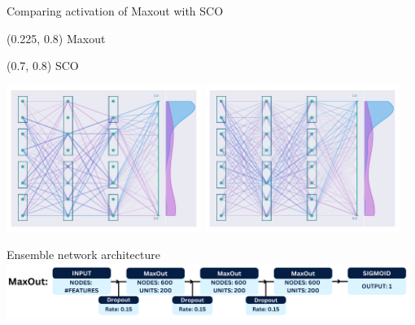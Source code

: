 \documentclass[UKenglish]{beamer}
\begin{document}
\begin{frame}{Comparing activation of Maxout with SCO}
    \begin{textblock}{0.8}(0.225, 0.8)
        {Maxout}
    \end{textblock}
    \begin{textblock}{0.8}(0.7, 0.8)
        {SCO}
    \end{textblock}
    \vfill
    \begin{center}
        \includegraphics[width = 0.475\textwidth]{figures/NetworkVis/AfterTraining.pdf}
        \includegraphics[width = 0.475\textwidth]{figures/NetworkVis/SCO/AfterTraining.pdf}
    \end{center}
\end{frame}
\begin{frame}{Ensemble network architecture}
    \vfill
    \includegraphics[width = 0.98\textwidth]{figures/maxout.png}
\end{frame}
\end{document}
